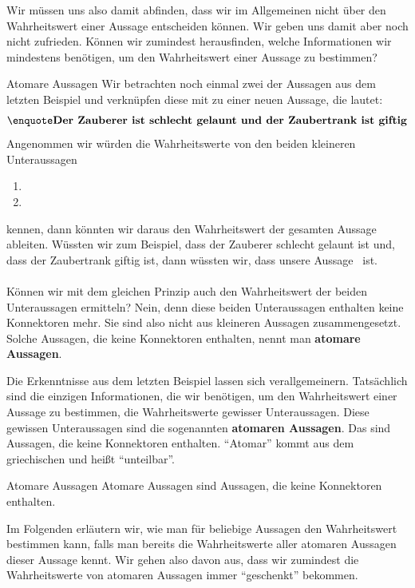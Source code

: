 \documentclass[../../main.tex]{subfiles}
\begin{document}
Wir müssen uns also damit abfinden, dass wir im Allgemeinen nicht über den Wahrheitswert einer Aussage entscheiden können. Wir geben uns damit aber noch nicht zufrieden. Können wir zumindest herausfinden, welche Informationen wir mindestens benötigen, um den Wahrheitswert einer Aussage zu bestimmen?

\begin{example}{Atomare Aussagen}
Wir betrachten noch einmal zwei der Aussagen aus dem letzten Beispiel und verknüpfen diese mit  zu einer neuen Aussage, die lautet:
\[\statement{Der Zauberer ist schlecht gelaunt und der Zaubertrank ist giftig}\]
Angenommen wir würden die Wahrheitswerte von den beiden kleineren Unteraussagen
\begin{enumerate}
    \item {}
    \item {}
\end{enumerate}
kennen, dann könnten wir daraus den Wahrheitswert der gesamten Aussage ableiten. Wüssten wir zum Beispiel, dass der Zauberer schlecht gelaunt ist und, dass der Zaubertrank giftig ist, dann wüssten wir, dass unsere Aussage  \wahr\  ist.
\\ \\
Können wir mit dem gleichen Prinzip auch den Wahrheitswert der beiden Unteraussagen ermitteln? Nein, denn diese beiden Unteraussagen enthalten keine Konnektoren mehr. Sie sind also nicht aus kleineren Aussagen zusammengesetzt. Solche Aussagen, die keine Konnektoren enthalten, nennt man \textbf{atomare Aussagen}.
\end{example}

Die Erkenntnisse aus dem letzten Beispiel lassen sich verallgemeinern. Tatsächlich sind die einzigen Informationen, die wir benötigen, um den Wahrheitswert einer Aussage zu bestimmen, die Wahrheitswerte gewisser Unteraussagen. Diese gewissen Unteraussagen sind die sogenannten \textbf{atomaren Aussagen}. Das sind Aussagen, die keine Konnektoren enthalten. \enquote{Atomar} kommt aus dem griechischen und heißt \enquote{unteilbar}.

\begin{definition} {Atomare Aussagen}
Atomare Aussagen sind Aussagen, die keine Konnektoren enthalten.
\end{definition}

Im Folgenden erläutern wir, wie man für beliebige Aussagen den Wahrheitswert bestimmen kann, falls man bereits die Wahrheitswerte aller atomaren Aussagen dieser Aussage kennt. Wir gehen also davon aus, dass wir zumindest die Wahrheitswerte von atomaren Aussagen immer \enquote{geschenkt} bekommen.
\end{document}
